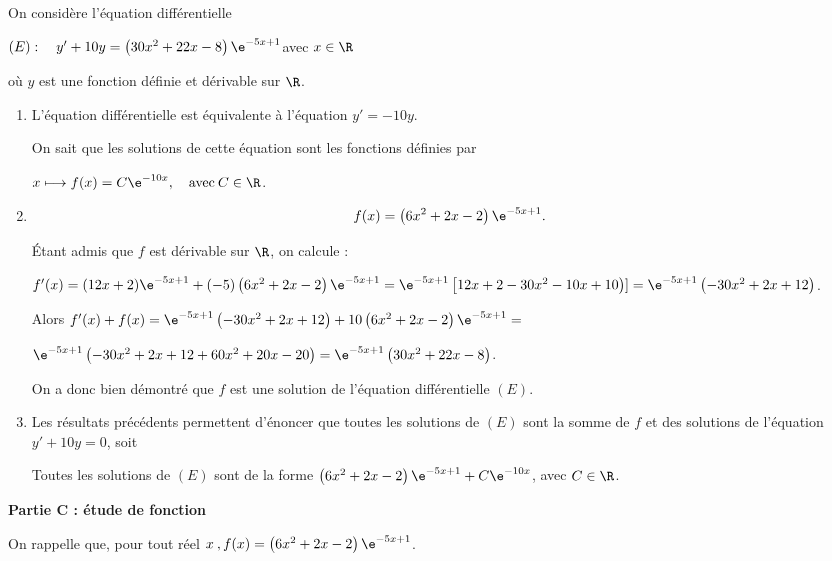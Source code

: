 On considère l'équation différentielle 

\begin{center}$(E) :\quad  y' + 10y = \left(30x^2 + 22x - 8\right)\e^{-5x+1}$\quad avec \quad $x \in \R$\end{center}

où $y$ est une fonction définie et dérivable sur $\R$.

\medskip

\begin{enumerate}
\item 
L'équation différentielle est équivalente à l'équation $y' = - 10y$.

On sait que les solutions de cette équation sont les fonctions définies par 

$x \longmapsto f(x) = C\e^{-10x}, \quad \text{avec}\: C \in \R$.
\item 

\[f(x) = \left(6x^2 + 2x - 2\right)\e^{-5x+ 1}.\]




Étant admis que $f$ est dérivable sur $\R$, on calcule :

$f'(x) = (12x + 2)\e^{-5x+ 1} + (- 5)\left(6x^2 + 2x - 2\right)\e^{-5x+ 1} = \e^{-5x+ 1}\left[12x + 2 - 30x^2- 10x + 10\right)] = \e^{-5x+ 1}\left(-30x^2 + 2x + 12\right)$.

Alors $f'(x) + f(x) = \e^{-5x+ 1}\left(-30x^2 + 2x + 12\right) + 10\left(6x^2 + 2x - 2\right)\e^{-5x+ 1} =$

$ \e^{-5x+ 1}\left(-30x^2 + 2x + 12 + 60x^2 + 20x - 20\right) = \e^{-5x+ 1}\left(30x^2 + 22x - 8\right)$.

On a donc bien démontré que $f$ est une solution de l'équation différentielle $(E)$.
\item 
Les résultats précédents permettent d'énoncer que toutes les solutions de $(E)$ sont la somme de $f$ et des solutions de l'équation $y' + 10y = 0$, soit 

Toutes les solutions de $(E)$ sont de la forme $\left(6x^2 + 2x - 2\right)\e^{-5x+ 1} + C\e^{-10x}$, avec $C \in \R$.
\end{enumerate}

\medskip

\textbf{Partie C : étude de fonction}

\medskip



On rappelle que, pour tout réel $x\:, f(x) = \left(6x^2 + 2x - 2\right)\e^{-5x+ 1}$.



